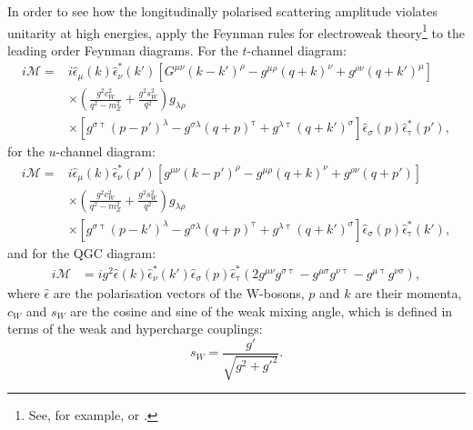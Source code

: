 In order to see how the longitudinally polarised scattering amplitude violates unitarity at high energies, apply the Feynman rules for electroweak theory\footnote{See, for example, \cite{mann} or \cite{griffiths}.} to the leading order Feynman diagrams. For the $t$-channel diagram:
\begin{eqnarray}
i \mathcal{M} =& i \hat{\epsilon}_{\mu}(k)\hat{\epsilon}_{\nu}^{*}(k') \left[G^{\mu \nu} \left( k - k' \right)^{\rho} - g^{\mu \rho} \left(q + k \right)^{\nu} + g^{\rho \nu} \left( q + k' \right)^{\mu} \right] \nonumber \\
& \times  \left( \frac{g^{2}c_{W}^{2}}{q^{2} - m_{Z}^{2}} + \frac{g^{2}s_{W}^{2}}{q^{2}} \right)g_{\lambda \rho} \nonumber \\
& \times \left[ g^{\sigma \uptau} \left(p - p' \right)^{\lambda} - g^{\sigma \lambda} \left( q + p \right)^{\uptau} + g^{\lambda \uptau}\left(q +k' \right)^{\sigma} \right] \hat{\epsilon}_{\sigma}(p) \hat{\epsilon}_{\uptau}^{*}(p'),
\end{eqnarray}
for the $u$-channel diagram:
\begin{eqnarray}
i \mathcal{M} = & i \hat{\epsilon}_{\mu}(k) \hat{\epsilon}_{\nu}^{*}(p') \left[ g^{\mu \nu} \left( k - p' \right)^{\rho} - g^{\mu \rho} \left(q + k \right)^{\nu} + g^{\rho \nu} \left( q + p' \right) \right] \nonumber \\
& \times \left( \frac{g^{2}c_{W}^{2}}{q^{2}-m_{Z}^{2}} + \frac{g^{2}s_{W}^{2}}{q^{2}} \right)g_{\lambda \rho} \nonumber \\
&\times \left[ g^{\sigma \uptau} \left(p - k' \right)^{\lambda} - g^{\sigma \lambda} \left( q + p \right)^{\uptau} + g^{\lambda \uptau} \left( q + k' \right)^{\sigma} \right] \hat{\epsilon}_{\sigma}(p)\hat{\epsilon}_{\uptau}^{*}(k'),
\end{eqnarray}
and for the QGC diagram:
\begin{eqnarray}
i \mathcal{M} &= i g^{2} \hat{\epsilon}(k) \hat{\epsilon}_{\nu}^{*}(k')\hat{\epsilon}_{\sigma}(p)\hat{\epsilon}_{\uptau}^{*} \left( 2g^{\mu \nu}g^{\sigma \uptau} - g^{\mu \sigma}g^{\nu \uptau} - g^{\mu \uptau}g^{\nu \sigma} \right),
\end{eqnarray}
where $\hat{\epsilon}$ are the polarisation vectors of the W-bosons, $p$ and $k$ are their momenta, $c_{W}$ and $s_{W}$ are the cosine and sine of the weak mixing angle, which is defined in terms of the weak and hypercharge couplings:
\begin{equation}
s_{W} = \frac{g'}{\sqrt{g^{2} + {g'}^{2}}}.
\end{equation}

